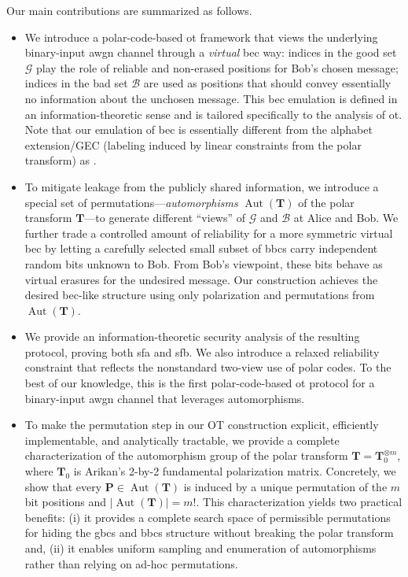 \documentclass[onecolumn]{IEEEtran} %
\newcommand{\1}{\mathbbm{1}}
\DeclareMathOperator{\Aut}{Aut}
\theoremstyle{boldremark}
\newcommand{\bT}{\mathbf{T}}
\begin{document}
Our main contributions are summarized as follows.
\begin{itemize}
  \item[(1)] We introduce a polar-code-based \gls{ot} framework that views the
  underlying binary-input \gls{awgn} channel through a \emph{virtual} \gls{bec} way:
  indices in the good set $\mathcal{G}$ play the role of reliable and
  non-erased positions for Bob's chosen message; indices in the
  bad set $\mathcal{B}$ are used as positions that should convey essentially
  no information about the unchosen message.
  This \gls{bec} emulation is defined in an information-theoretic sense and is
  tailored specifically to the analysis of \gls{ot}. Note that our emulation of \gls{bec} is essentially different from the alphabet extension/GEC (labeling induced by linear constraints from the polar
  transform) as \cite{SudaWatanabe25}.

  \item[(2)] To mitigate leakage from the publicly shared information, we introduce a special set of permutations---\textit{automorphisms} $\Aut(\bT)$ of the
  polar transform $\bT$---to generate different ``views'' of $\mathcal{G}$ and
  $\mathcal{B}$ at Alice and Bob. 
  We further trade a controlled amount of reliability for a more symmetric
  virtual \gls{bec} by letting a carefully selected small subset of \gls{bbcs} carry independent random bits unknown to Bob. From Bob's viewpoint, these bits behave as virtual erasures for the undesired message.
  Our construction achieves the desired \gls{bec}-like structure using only
  polarization and permutations from $\Aut(\bT)$.

  \item[(3)] We provide an information-theoretic security analysis of the
  resulting protocol, proving both \gls{sfa} and \gls{sfb}. We also introduce a relaxed reliability constraint that reflects the nonstandard two-view use of polar codes.
  To the best of our knowledge, this is the first polar-code-based \gls{ot} protocol for a binary-input \gls{awgn} channel that leverages automorphisms.

  \item[(4)] To make the permutation step in our OT construction explicit, efficiently
  implementable, and analytically tractable, we provide a complete
  characterization of the automorphism group of the polar transform
  $\bT=\bT_0^{\otimes m}$, where $\bT_0$ is Arikan's 2-by-2 fundamental polarization matrix. Concretely, we show that every $\mathbf P\in\Aut(\bT)$ is
  induced by a unique permutation of the $m$ bit positions and $|\Aut(\bT)|=m!$.
  This characterization yields two practical benefits: (i) it provides a
  complete search space of permissible permutations for hiding the
  \gls{gbcs} and \gls{bbcs} structure without breaking the polar transform and, (ii) it enables
  uniform sampling and enumeration of automorphisms rather than relying on ad-hoc
  permutations.


\end{itemize}
\end{document}
